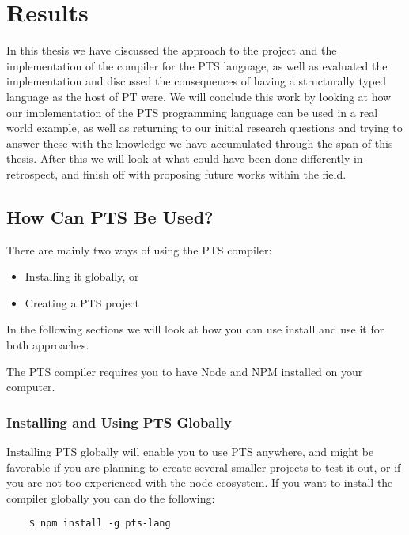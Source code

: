 \chapter{Results}\label{ch:results}

In this thesis we have discussed the approach to the project and the implementation of the compiler for the PTS language, as well as evaluated the implementation and discussed the consequences of having a structurally typed language as the host of PT were.
We will conclude this work by looking at how our implementation of the PTS programming language can be used in a real world example, as well as returning to our initial research questions and trying to answer these with the knowledge we have accumulated through the span of this thesis.
After this we will look at what could have been done differently in retrospect, and finish off with proposing future works within the field.

\section{How Can PTS Be Used?}\label{sec:how-can-this-be-used?}

There are mainly two ways of using the PTS compiler:

\begin{itemize}
    \item Installing it globally, or
    \item Creating a PTS project
\end{itemize}

In the following sections we will look at how you can use install and use it for both approaches.

The PTS compiler requires you to have Node and NPM installed on your computer.

\subsection{Installing and Using PTS Globally}\label{subsec:installing-and-using-pts-globally}

Installing PTS globally will enable you to use PTS anywhere, and might be favorable if you are planning to create several smaller projects to test it out, or if you are not too experienced with the node ecosystem.
If you want to install the compiler globally you can do the following:

\begin{verbatim}
    $ npm install -g pts-lang
\end{verbatim}

